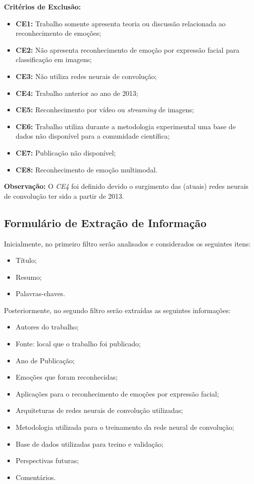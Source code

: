 \textbf{Critérios de Exclusão:}
 \begin{itemize}
  \item \textbf{CE1:} Trabalho somente apresenta teoria ou discussão relacionada ao reconhecimento de emoções;
  \item \textbf{CE2:} Não apresenta reconhecimento de emoção por expressão facial para classificação em imagens;
  \item \textbf{CE3:} Não utiliza redes neurais de convolução;
  \item \textbf{CE4:} Trabalho anterior ao ano de 2013;
  \item \textbf{CE5:} Reconhecimento por vídeo ou \textit{streaming} de imagens;
  \item \textbf{CE6:} Trabalho utiliza durante a metodologia experimental uma base de dados não disponível para a comunidade científica;
  \item \textbf{CE7:} Publicação não disponível;
  \item \textbf{CE8:} Reconhecimento de emoção multimodal.
 \end{itemize}
\textbf{Observação:} O \textit{CE4} foi definido devido o surgimento das (atuais) redes neurais de convolução ter sido a partir de 2013.

\subsection{Formulário de Extração de Informação}
Inicialmente, no primeiro filtro serão analisados e considerados os seguintes itens:
\begin{itemize}
 \item Título;
 \item Resumo;
 \item Palavras-chaves.
\end{itemize}

Posteriormente, no segundo filtro serão extraídas as seguintes informações:
\begin{itemize}
 \item Autores do trabalho;
 \item Fonte: local que o trabalho foi publicado;
 \item Ano de Publicação;
 \item Emoções que foram reconhecidas;
 \item Aplicações para o reconhecimento de emoções por expressão facial;
 \item Arquiteturas de redes neurais de convolução utilizadas;
 \item Metodologia utilizada para o treinamento da rede neural de convolução;
 \item Base de dados utilizadas para treino e validação;
 \item Perspectivas futuras;
 \item Comentários.
\end{itemize}

